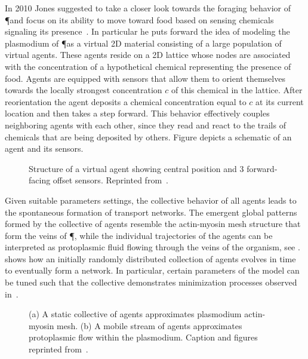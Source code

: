 			In 2010 Jones suggested to take a closer look towards the foraging behavior of \P and focus on its ability to move toward food based on sensing chemicals signaling its presence~\cite{jones2010characteristics}. In particular he puts forward the idea of modeling the plasmodium of \P as a virtual 2D material consisting of a large population of virtual agents. These agents reside on a 2D lattice whose nodes are associated with the concentration of a hypothetical chemical representing the presence of food. Agents are equipped with sensors that allow them to orient themselves towards the locally strongest concentration $c$ of this chemical in the lattice. After reorientation the agent deposits a chemical concentration equal to $c$ at its current location and then takes a step forward. This behavior effectively couples neighboring agents with each other, since they read and react to the trails of chemicals that are being deposited by others. Figure  depicts a schematic of an agent and its sensors.

			\begin{figure}
				\centering
				
				\caption[Multi-agent \P - Agent schematic]{Structure of a virtual agent showing central position and $3$ forward-facing offset sensors. Reprinted from~\cite{jones2010characteristics}.}
				\label{fig:agent}
			\end{figure}

			Given suitable parameters settings, the collective behavior of all agents leads to the spontaneous formation of transport networks. The emergent global patterns formed by the collective of agents resemble the actin-myosin mesh structure that form the veins of \P, while the individual trajectories of the agents can be interpreted as protoplasmic fluid flowing through the veins of the organism, see .  shows how an initially randomly distributed collection of agents evolves in time to eventually form a network. In particular, certain parameters of the model can be tuned such that the collective demonstrates minimization processes observed in~\cite{jones2011influences,jones2015applications,baumgarten2015network}. 

			\begin{figure}
				\centering
				
				\caption[Multi-agent \P - Collective behavior of agents]{(a) A static collective of agents approximates plasmodium actin-myosin mesh. (b) A mobile stream of agents approximates protoplasmic flow within the plasmodium. Caption and figures reprinted from~\cite{jones2010characteristics}.}
				\label{fig:agent_structures}
			\end{figure}

